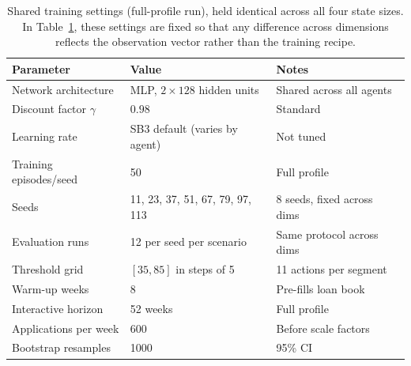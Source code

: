 \documentclass[preprint,review,authoryear,12pt]{elsarticle}
\begin{document}
\begin{table}[H]
    \centering
    \small
    \caption{Shared training settings (full-profile run), held identical across all four state sizes. In Table~\ref{tab:hyperparams}, these settings are fixed so that any difference across dimensions reflects the observation vector rather than the training recipe.}
    \label{tab:hyperparams}
    \begin{tabular}{l l l}
        \toprule
        Parameter                & Value                           & Notes                      \\
        \midrule
        Network architecture     & MLP, $2\times 128$ hidden units & Shared across all agents   \\
        Discount factor $\gamma$ & $0.98$                          & Standard                   \\
        Learning rate            & SB3 default (varies by agent)   & Not tuned                  \\
        Training episodes/seed   & 50                              & Full profile               \\
        Seeds                    & 11, 23, 37, 51, 67, 79, 97, 113 & 8 seeds, fixed across dims \\
        Evaluation runs          & 12 per seed per scenario        & Same protocol across dims  \\
        Threshold grid           & $[35, 85]$ in steps of 5        & 11 actions per segment     \\
        Warm-up weeks            & 8                               & Pre-fills loan book        \\
        Interactive horizon      & 52 weeks                        & Full profile               \\
        Applications per week    & 600                             & Before scale factors       \\
        Bootstrap resamples      & 1000                            & 95\% CI                    \\
        \bottomrule
    \end{tabular}
\end{table}
\end{document}
